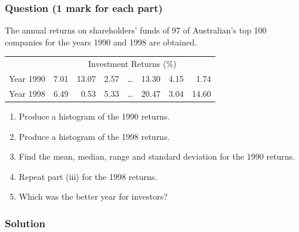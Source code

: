 \documentclass[a4paper,oneside]{book}
\begin{document}
\subsubsection*{Question (1 mark for each part)}

The annual returns on shareholders' funds of 97 of Australian's top
100 companies for the years 1990 and 1998 are obtained.
\begin{center}
\begin{tabular}{lrrrrrrr}
  & \multicolumn{7}{c}{Investment Returns (\%)} \\
  Year 1990 & 7.01 & 13.07 & 2.57 & \ldots & 13.30 & 4.15 & 1.74 \\
  Year 1998 & 6.49 & 0.53  & 5.33 & \ldots & 20.47 & 3.04 & 14.60 \\
\end{tabular}
\end{center}
\begin{enumerate}
\item Produce a histogram of the 1990 returns.
\item Produce a histogram of the 1998 returns.
\item Find the mean, median, range and standard deviation for the 1990 returns.
\item Repeat part (iii) for the 1998 returns.
\item Which was the better year for investors?
\end{enumerate}

\subsubsection*{Solution}
\end{document}

